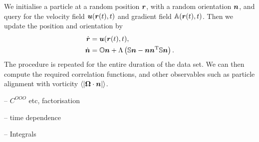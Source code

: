 \documentclass[thesis.tex]{subfiles}
\begin{document}
We initialise a particle at a random position $\mbox{\boldmath$r$}$, with a random orientation $\mbox{\boldmath$n$}$, and query for the velocity field $\mbox{\boldmath$u$}(\mbox{\boldmath$r$}(t), t)$ and gradient field $\mathbb{A}(\mbox{\boldmath$r$}(t), t)$. Then we update the position and orientation by
\begin{align*}
	\dot {\mbox{\boldmath$r$}} &= \mbox{\boldmath$u$}(\mbox{\boldmath$r$}(t), t), \\
	\dot {\mbox{\boldmath$n$}} &= \mathbb{O} \mbox{\boldmath$n$} + \Lambda\left(\mathbb{S} \mbox{\boldmath$n$} - \mbox{\boldmath$n$} \mbox{\boldmath$n$}^{\mathrm T} \mathbb{S} \mbox{\boldmath$n$}\right).
\end{align*}
The procedure is repeated for the entire duration of the data set. We can then compute the required correlation functions, and other observables such as particle alignment with vorticity $\langle|\mbox{\boldmath$\Omega$} \cdot \mbox{\boldmath$n$}|\rangle$. 


-- $C^{OOO}$ etc, factorisation

-- time dependence

-- Integrals
\end{document}
